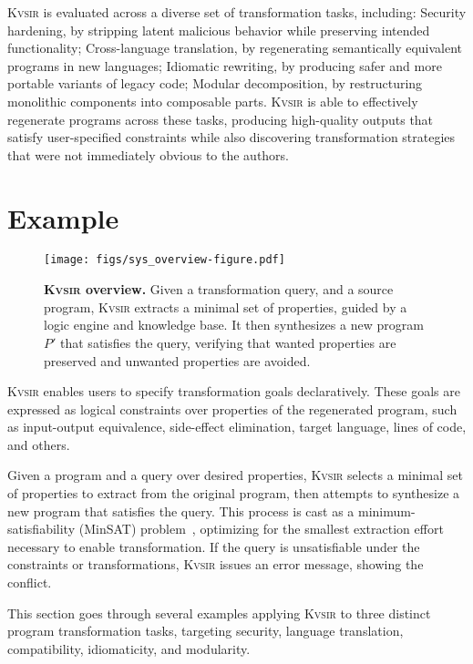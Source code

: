\documentclass[sigplan]{acmart}
\newcommand{\sys}{{\scshape Kv{\textalpha}sir}\xspace}
\begin{document}
\sys is evaluated across a diverse set of transformation tasks, including:
	Security hardening, by stripping latent malicious behavior while preserving intended functionality;
	Cross-language translation, by regenerating semantically equivalent programs in new languages;
	Idiomatic rewriting, by producing safer and more portable variants of legacy code;
	Modular decomposition, by restructuring monolithic components into composable parts.
\sys is able to effectively regenerate programs across these tasks, producing high-quality outputs that satisfy user-specified constraints while also discovering transformation strategies that were not immediately obvious to the authors.

\section{Example}
\label{sec:example}
\begin{figure}[ht]
  \texttt{[image: figs/sys\_overview-figure.pdf]}
  \caption{\textbf{\sys overview.}
Given a transformation query, and a source program, \sys extracts a minimal set
  of properties,
  guided by a logic engine and knowledge base.
  It then synthesizes a new program $P'$ that satisfies the query, verifying
  that wanted properties are preserved and unwanted properties are avoided.
}
\end{figure}

\sys enables users to specify transformation goals declaratively.
These goals are expressed as logical constraints over properties of the
regenerated program, such as input-output equivalence, side-effect elimination,
target language, lines of code, and others.

Given a program and a query over desired properties, \sys selects a minimal set
of properties to extract from the original program, then attempts to synthesize
a new program that satisfies the query.
This process is cast as a
minimum-satisfiability (MinSAT) problem~\cite{kohli1994minimum}, optimizing for the smallest extraction
effort necessary to enable transformation.
If the query is unsatisfiable under
the constraints or transformations, \sys issues an error
message, showing the conflict.

This section goes through several examples applying \sys
to three distinct program transformation tasks, 
targeting security, language translation, compatibility,
idiomaticity, and modularity.
\end{document}
